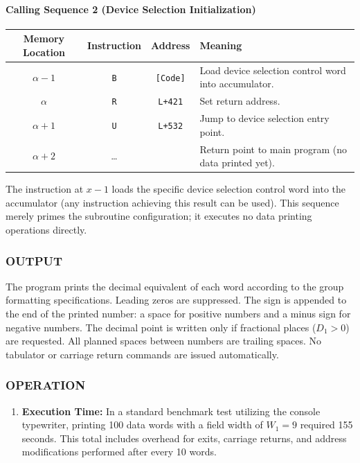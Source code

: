 \paragraph{Calling Sequence 2 (Device Selection Initialization)}
\begin{table}[h!]
\centering
\begin{tabularx}{\textwidth}{cccX}
\toprule
\textbf{Memory Location} & \textbf{Instruction} & \textbf{Address} & \textbf{Meaning} \\
\midrule
$\alpha-1$             & \texttt{B}      & \texttt{[Code]}  & Load device selection control word into accumulator. \\
$\alpha$               & \texttt{R}      & \texttt{L+421}   & Set return address. \\
$\alpha+1$             & \texttt{U}      & \texttt{L+532}   & Jump to device selection entry point. \\
$\alpha+2$             & \dots           &                  & Return point to main program (no data printed yet). \\
\bottomrule
\end{tabularx}
\end{table}
The instruction at $x-1$ loads the specific device selection control word into the accumulator (any instruction achieving this result can be used). This sequence merely primes the subroutine configuration; it executes no data printing operations directly.

\subsubsection*{OUTPUT}
The program prints the decimal equivalent of each word according to the group formatting specifications. Leading zeros are suppressed. The sign is appended to the end of the printed number: a space for positive numbers and a minus sign for negative numbers. The decimal point is written only if fractional places ($D_1 > 0$) are requested. All planned spaces between numbers are trailing spaces. No tabulator or carriage return commands are issued automatically.

\subsubsection*{OPERATION}
\begin{enumerate}
    \item \textbf{Execution Time:} In a standard benchmark test utilizing the console typewriter, printing 100 data words with a field width of $W_1 = 9$ required 155 seconds. This total includes overhead for exits, carriage returns, and address modifications performed after every 10 words.
\end{enumerate}

